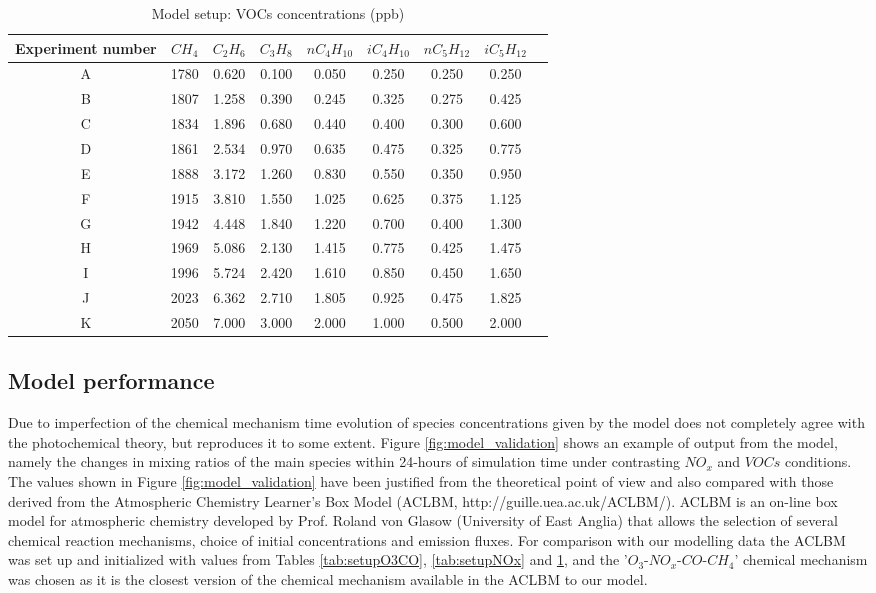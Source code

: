 \documentclass[11pt,a4paper]{article}
\begin{document}
\begin{table} %
\caption{Model setup: VOCs concentrations (ppb)}\label{tab:setupVOCs}
\centering
\begin{tabular}{ccccccccc}
\hline
Experiment number & $CH_4$ & $C_2H_6$ & $C_3H_8$ & $nC_4H_{10}$ & $iC_4H_{10}$ & $nC_5H_{12}$ & $iC_5H_{12}$ \\
\hline
A  & 1780 &	0.620 &	0.100 &	0.050 &	0.250 &	0.250 &	0.250 \\
B  & 1807 &	1.258 &	0.390 &	0.245 &	0.325 &	0.275 &	0.425 \\
C  & 1834 &	1.896 &	0.680 &	0.440 &	0.400 &	0.300 &	0.600 \\
D  & 1861 &	2.534 &	0.970 &	0.635 &	0.475 &	0.325 &	0.775 \\
E  & 1888 &	3.172 &	1.260 &	0.830 &	0.550 &	0.350 &	0.950 \\
F  & 1915 &	3.810 &	1.550 &	1.025 &	0.625 &	0.375 &	1.125 \\
G  & 1942 &	4.448 &	1.840 &	1.220 &	0.700 &	0.400 &	1.300 \\
H  & 1969 &	5.086 &	2.130 &	1.415 &	0.775 &	0.425 &	1.475 \\
I  & 1996 &	5.724 &	2.420 &	1.610 &	0.850 &	0.450 &	1.650 \\
J  & 2023 &	6.362 &	2.710 &	1.805 &	0.925 &	0.475 &	1.825 \\
K  & 2050 &	7.000 &	3.000 &	2.000 &	1.000 &	0.500 &	2.000 \\
\hline
\end{tabular}
\end{table}
\subsection{Model performance}
Due to imperfection of the chemical mechanism time evolution of species concentrations given by the model does not completely agree with the photochemical theory, but reproduces it to some extent. Figure \ref{fig:model_validation} shows an example of output from the model, namely the changes in mixing ratios of the main species within 24-hours of simulation time under contrasting $NO_x$ and $VOCs$ conditions. The values shown in Figure \ref{fig:model_validation} have been justified from the theoretical point of view and also compared with those derived from the Atmospheric Chemistry Learner's Box Model (ACLBM, http://guille.uea.ac.uk/ACLBM/). ACLBM is an on-line box model for atmospheric chemistry developed by Prof. Roland von Glasow (University of East Anglia) that allows the selection of several chemical reaction mechanisms, choice of initial concentrations and emission fluxes. For comparison with our modelling data the ACLBM was set up and initialized with values from Tables \ref{tab:setupO3CO}, \ref{tab:setupNOx} and \ref{tab:setupVOCs}, and the '$O_3$-$NO_x$-$CO$-$CH_4$' chemical mechanism was chosen as it is the closest version of the chemical mechanism available in the ACLBM to our model.
\end{document}
